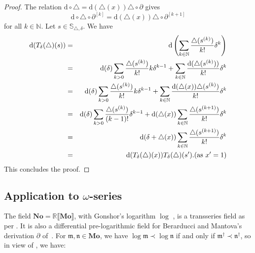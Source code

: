 \documentclass{article}
\newcommand{\mathd}{\mathrm{d}}
\theoremstyle{remark}\newtheorem*{convention*}{Convention}
\begin{document}
\begin{proof}
  The relation $\mathd \circ \triangle = \mathd (\triangle (x)) \triangle
  \circ \partial$ gives
  \[ \mathd \circ \triangle \circ \partial^{[k]} = \mathd (\triangle (x))
     \triangle \circ \partial^{[k + 1]} \]
  for all $k \in \mathbb{N}$. Let $s \in \mathbb{S}_{\triangle, \delta}$. We
  have
  \begin{eqnarray*}
    \mathd (T_{\delta} (\triangle) (s)) & = & \mathd \left( \sum_{k \in
    \mathbb{N}} \frac{\triangle (s^{(k)})}{k!} \delta^k \right)\\
    & = & \mathd (\delta)  \sum_{k > 0} \frac{\triangle (s^{(k)})}{k!} k
    \delta^{k - 1} + \sum_{k \in \mathbb{N}} \frac{\mathd (\triangle
    (s^{(k)}))}{k!} \delta^k\\
    & = & \mathd (\delta)  \sum_{k > 0} \frac{\triangle (s^{(k)})}{k!} k
    \delta^{k - 1} + \sum_{k \in \mathbb{N}} \frac{\mathd (\triangle (x))
    \triangle (s^{(k)})}{k!} \delta^k\\
    & = & \mathd (\delta)  \sum_{k > 0} \frac{\triangle (s^{(k)})}{(k - 1) !}
    \delta^{k - 1} + \mathd (\triangle (x))  \sum_{k \in \mathbb{N}}
    \frac{\triangle (s^{(k + 1)})}{k!} \delta^k\\
    & = & \mathd (\delta + \triangle (x))  \sum_{k \in \mathbb{N}}
    \frac{\triangle (s^{(k + 1)})}{k!} \delta^k\\
    & = & \mathd (T_{\delta} (\triangle) (x)) T_{\delta} (\triangle) (s') .
    \text{{\hspace*{\fill}}(as $x' = 1$)}
  \end{eqnarray*}
  This concludes the proof.
\end{proof}

\subsection{Application to
\texorpdfstring{$\omega$}{ω}-series}\label{subsection-application-w-series}

The field $\mathbf{No} =\mathbb{R} \llbracket \mathbf{Mo} \rrbracket$, with
Gonshor's logarithm $\log$ {\cite[Chapter~10]{Gon86}}, is a transseries field
as per {\cite[Definition 2.2.1]{Schm01}}. It is also a differential
pre-logarithmic field for Berarducci and Mantova's derivation $\partial$
of~{\cite{BM18}}. For $\mathfrak{m}, \mathfrak{n} \in \mathbf{Mo}$, we have
$\log \mathfrak{m} \prec \log \mathfrak{n}$ if and only if
$\mathfrak{m}^{\dag} \prec \mathfrak{n}^{\dag}$, so in view of
{\cite[Proposition~2.2.4(1)]{Schm01}}, we have:
\end{document}
